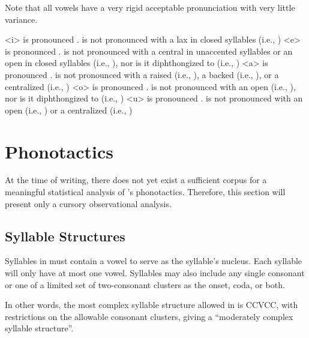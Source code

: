Note that all \langtvk{} vowels have a very rigid acceptable pronunciation with very little variance.

	   is pronounced .  is not pronounced with a lax  in closed syllables (i.e., )
	   is pronounced .  is not pronounced with a central  in unaccented syllables or an open  in closed syllables (i.e., ), nor is it diphthongized to  (i.e., )
	   is pronounced .  is not pronounced with a raised  (i.e., ), a backed  (i.e., ), or a centralized  (i.e., )
	   is pronounced .  is not pronounced with an open  (i.e., ), nor is it diphthongized to  (i.e., )
	   is pronounced .  is not pronounced with an open  (i.e., ) or a centralized  (i.e., )
\xe

\section{\langtvk{} Phonotactics}
\label{sec:tvk-phonotactics}

At the time of writing, there does not yet exist a sufficient corpus for a meaningful statistical analysis of \langtvk's phonotactics. Therefore, this section will present only a cursory observational analysis.

\subsection{Syllable Structures}
\label{subsec:tvk-syll-struc}

Syllables in \langtvk{} must contain a vowel to serve as the syllable's nucleus. Each syllable will only have at most one vowel. Syllables may also include any single consonant or one of a limited set of two-consonant clusters as the onset, coda, or both.

In other words, the most complex syllable structure allowed in \langtvk{} is CCVCC, with restrictions on the allowable consonant clusters, giving \langtvk{} a \enquote{moderately complex syllable structure}.\autocite{wals-12}

